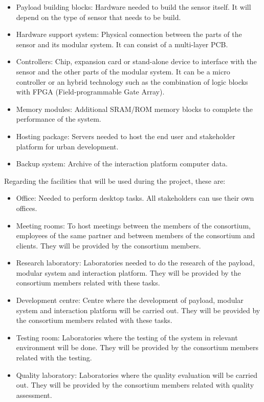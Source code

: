 \begin{itemize}
\item Payload building blocks: Hardware needed to build the sensor itself. It will depend on the type of sensor that needs to be build.
\item Hardware support system: Physical connection between the parts of the sensor and its modular system. It can consist of a multi-layer PCB.
\item Controllers: Chip, expansion card or stand-alone device to interface with the sensor and the other parts of the modular system. It can be a micro controller or an hybrid technology such as the combination of logic blocks with FPGA (Field-programmable Gate Array).
\item Memory modules: Additional SRAM/ROM memory blocks to complete the performance of the system.
\item Hosting package: Servers needed to host the end user and stakeholder platform for urban development.
\item Backup system: Archive of the interaction platform computer data. 
\end{itemize}
Regarding the facilities that will be used during the project, these are:
\begin{itemize}
\item Office: Needed to perform desktop tasks. All stakeholders can use their own offices.
\item Meeting rooms: To host meetings between the members of the consortium, employees of the same partner and between members of the consortium and clients. They will be provided by the consortium members. 
\item Research laboratory: Laboratories needed to do the research of the payload, modular system and interaction platform. They will be provided by the consortium members related with these tasks. 
\item Development centre: Centre where the development of payload, modular system and interaction platform will be carried out. They will be provided by the consortium members related with these tasks.
\item Testing room: Laboratories where the testing of the system in relevant environment will be done. They will be provided by the consortium members related with the testing.
\item Quality laboratory: Laboratories where the quality evaluation will be carried out. They will be provided by the consortium members related with quality assessment. 
\end{itemize}

